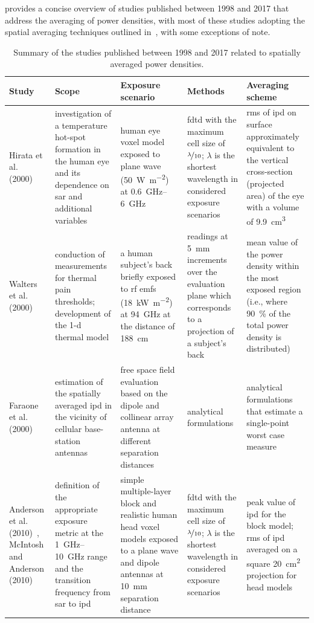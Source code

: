  provides a concise overview of studies published between 1998 and 2017 that address the averaging of power densities, with most of these studies adopting the spatial averaging techniques outlined in~\cite{ICNIRP1998Guidlines}, with some exceptions of note.
\begin{table}
\begin{center}
\caption{Summary of the studies published between 1998 and 2017 related to spatially averaged power densities.}
\label{tab:summary_1998_2018}
\begin{tabularx}{\textwidth}{|X|X|X|X|X|}
\hline
\textbf{Study} & \textbf{Scope} & \textbf{Exposure scenario} & \textbf{Methods} & \textbf{Averaging scheme} \\
\hline
Hirata et al. (2000)~\cite{Hirata2000Temperature} & investigation of a temperature hot-spot formation in the human eye and its dependence on \gls{sar} and additional variables & human eye voxel model exposed to plane wave (\SI{50}{\watt\per\meter\squared}) at \SIrange{0.6}{6}{\GHz} & \gls{fdtd} with the maximum cell size of $\nicefrac{\lambda}{10}$; $\lambda$ is the shortest wavelength in considered exposure scenarios & \gls{rms} of \gls{ipd} on surface approximately equivalent to the vertical cross-section (projected area) of the eye with a volume of \SI{9.9}{\cm\cubed} \\
\hline
Walters et al. (2000)~\cite{Walters2000Heating} & conduction of measurements for thermal pain thresholds; development of the \gls{1-d} thermal model & a human subject's back briefly exposed to \gls{rf} \gls{emf}s (\SI{18}{\kW\per\meter\squared}) at \SI{94}{\GHz} at the distance of \SI{188}{\cm} & readings at \SI{5}{\mm} increments over the evaluation plane which corresponds to a projection of a subject's back & mean value of the power density within the most exposed region (i.e., where \SI{90}{\percent} of the total power density is distributed) \\
\hline
Faraone et al. (2000)~\cite{Faraone2000Estimation} & estimation of the spatially averaged \gls{ipd} in the vicinity of cellular base-station antennas & free space field evaluation based on the dipole and collinear array antenna at different separation distances & analytical formulations & analytical formulations that estimate a single-point worst case measure\\
\hline
Anderson et al. (2010)~\cite{Anderson2010SAR}, McIntosh and Anderson (2010)~\cite{McIntosh2010SAR} & definition of the appropriate exposure metric at the \SIrange{1}{10}{\GHz} range and the transition frequency from \gls{sar} to \gls{ipd} & simple multiple-layer block and realistic human head voxel models exposed to a plane wave and dipole antennas at \SI{10}{\mm} separation distance & \gls{fdtd} with the maximum cell size of $\nicefrac{\lambda}{10}$; $\lambda$ is the shortest wavelength in considered exposure scenarios & peak value of \gls{ipd} for the block model; \gls{rms} of \gls{ipd} averaged on a square \SI{20}{\cm\squared} projection for head models\\

\end{tabularx}
\end{center}
\end{table}
